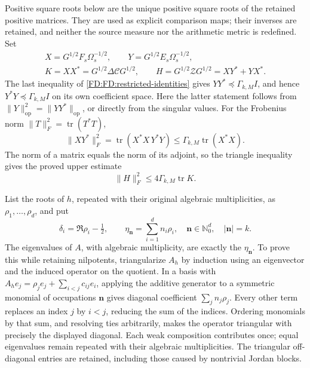 Positive square roots below are the unique positive square roots of the
retained positive matrices.  They are used as explicit comparison maps;
their inverses are retained, and neither the source measure nor the
arithmetic metric is redefined.  Set
\begin{equation}
\begin{gathered}
X=G^{1/2}F_s\Omega_s^{-1/2},\qquad
Y=G^{1/2}E_s\Omega_s^{-1/2},\\
K=XX^*=G^{1/2}\Delta\mathcal C G^{1/2},\qquad
H=G^{1/2}\mathcal ZG^{1/2}=XY^*+YX^*.
\end{gathered}
\tag{FD.28}\label{FD:FD:comparison-maps}
\end{equation}
The last inequality of \eqref{FD:FD:restricted-identities} gives
\(YY^*\preceq\Gamma_{k,M}I\), and hence
\(Y^*Y\preceq\Gamma_{k,M}I\) on its own coefficient space.  Here the
latter statement follows from \(\|Y\|_{\mathrm{op}}^2
=\|YY^*\|_{\mathrm{op}}\), or directly from the singular values.
For the Frobenius norm \(\|T\|_F^2=\operatorname{tr}(T^*T)\),
\[
\|XY^*\|_F^2
=\operatorname{tr}(X^*X\,Y^*Y)
\le\Gamma_{k,M}\operatorname{tr}(X^*X).
\]
The norm of a matrix equals the norm of its adjoint, so the triangle
inequality gives the proved upper estimate
\begin{equation}
\|H\|_F^2\le4\Gamma_{k,M}\operatorname{tr}K.
\tag{FD.29}\label{FD:FD:Frobenius-upper}
\end{equation}

List the roots of \(h\), repeated with their original algebraic
multiplicities, as \(\rho_1,\ldots,\rho_d\), and put
\begin{equation}
\delta_i=\Re\rho_i-\tfrac12,\qquad
\eta_{\mathbf n}=\sum_{i=1}^dn_i\rho_i,
\quad \mathbf n\in\mathbb N_0^d,\quad |\mathbf n|=k.
\tag{FD.30}\label{FD:FD:spectral-positions}
\end{equation}
The eigenvalues of \(A\), with algebraic multiplicity, are exactly the
\(\eta_{\mathbf n}\).  To prove this while retaining nilpotents,
triangularize \(A_h\) by induction using an eigenvector and the induced
operator on the quotient.  In a basis with
\(A_he_j=\rho_je_j+\sum_{i<j}c_{ij}e_i\), applying the additive
generator to a symmetric monomial of occupations \(\mathbf n\) gives
diagonal coefficient \(\sum_jn_j\rho_j\).  Every other term replaces
an index \(j\) by \(i<j\), reducing the sum of the indices.  Ordering
monomials by that sum, and resolving ties arbitrarily, makes the
operator triangular with precisely the displayed diagonal.  Each weak
composition contributes once; equal eigenvalues remain repeated with
their algebraic multiplicities.  The triangular off-diagonal entries
are retained, including those caused by nontrivial Jordan blocks.


